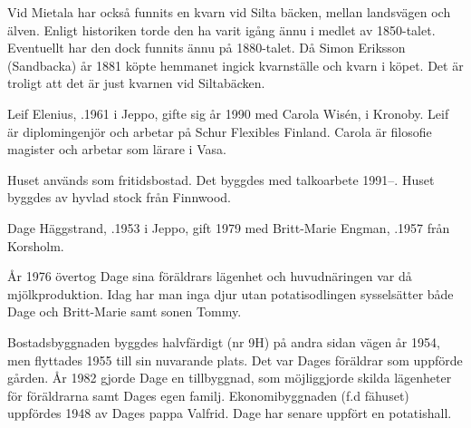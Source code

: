 
Vid Mietala har också funnits en kvarn vid Silta bäcken, mellan landsvägen och älven. Enligt historiken torde den ha varit igång ännu i medlet av 1850-talet. Eventuellt har den dock funnits ännu på 1880-talet. Då Simon Eriksson (Sandbacka) år 1881 köpte hemmanet ingick kvarnställe och kvarn  i köpet. Det är troligt att det är just kvarnen vid 		Siltabäcken.






Leif Elenius, .1961 i Jeppo, gifte sig år 1990 med Carola Wisén,  i Kronoby. Leif är diplomingenjör och arbetar på Schur Flexibles Finland. Carola är filosofie magister och arbetar som lärare i Vasa.

\begin{jhchildren}
  \item {}
  \item {}
  \item {}
\end{jhchildren}

Huset används som fritidsbostad. Det byggdes med talkoarbete 1991--. Huset byggdes av hyvlad stock från Finnwood.






Dage Häggstrand, .1953 i Jeppo, gift 1979 med Britt-Marie Engman, .1957 från Korsholm.

\begin{jhchildren}
  \item {}
  \item {}
\end{jhchildren}

År 1976 övertog Dage sina föräldrars lägenhet och huvudnäringen var då mjölkproduktion. Idag har man inga djur utan potatisodlingen sysselsätter både Dage och Britt-Marie samt sonen Tommy.

Bostadsbyggnaden byggdes halvfärdigt (nr 9H) på andra sidan vägen år 1954, men flyttades 1955 till sin nuvarande plats. Det var Dages föräldrar som uppförde gården. År 1982 gjorde Dage en tillbyggnad, som möjliggjorde skilda lägenheter för föräldrarna samt Dages egen familj. Ekonomibyggnaden (f.d fähuset) uppfördes 1948 av Dages pappa Valfrid. Dage har senare uppfört en potatishall.


